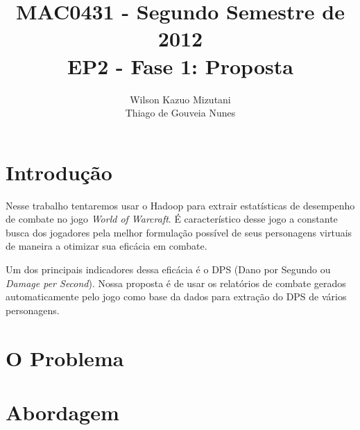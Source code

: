 \documentclass[a4paper,11pt]{article}
\title{MAC0431 - Segundo Semestre de 2012 \\
       EP2 - Fase 1: Proposta}
\author{Wilson Kazuo Mizutani \\ Thiago de Gouveia Nunes}
\begin{document}
\maketitle


\section{Introdução}

  Nesse trabalho tentaremos usar o Hadoop para extrair estatísticas de
  desempenho de combate no jogo \textit{World of Warcraft}. É característico
  desse jogo a constante busca dos jogadores pela melhor formulação possível de
  seus personagens virtuais de maneira a otimizar sua eficácia em combate.
  
  Um dos principais indicadores dessa eficácia é o DPS (Dano por Segundo ou
  \textit{Damage per Second}). Nossa proposta é de usar os relatórios de combate
  gerados automaticamente pelo jogo como base da dados para extração do DPS de
  vários personagens.

\section{O Problema}

  

\section{Abordagem}
\end{document}
